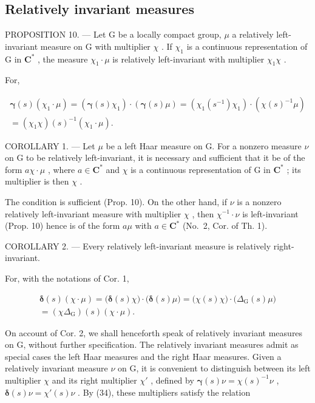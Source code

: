 \subsection{Relatively invariant measures}

PROPOSITION 10. --- Let G be a locally compact group, \(\mu\) a relatively left-invariant measure on G with multiplier \(\chi\) . If \(\chi_{1}\) is a continuous representation of G in \(\mathbf{C}^{*}\) , the measure \(\chi_{1} \cdot \mu\) is relatively left-invariant with multiplier \(\chi_{1}\chi\) .

For,

\[
\begin{array}{r} \pmb {\gamma} (s) (\chi_ {1} \cdot \mu) = (\pmb {\gamma} (s) \chi_ {1}) \cdot (\pmb {\gamma} (s) \mu) = (\chi_ {1} (s ^ {- 1}) \chi_ {1}) \cdot (\chi (s) ^ {- 1} \mu) \\ = (\chi_ {1} \chi) (s) ^ {- 1} (\chi_ {1} \cdot \mu). \end{array}
\]

COROLLARY 1. --- Let \(\mu\) be a left Haar measure on G. For a nonzero measure \(\nu\) on G to be relatively left-invariant, it is necessary and sufficient that it be of the form \(a\chi \cdot \mu\) , where \(a \in \mathbf{C}^*\) and \(\chi\) is a continuous representation of G in \(\mathbf{C}^*\) ; its multiplier is then \(\chi\) .

The condition is sufficient (Prop. 10). On the other hand, if \(\nu\) is a nonzero relatively left-invariant measure with multiplier \(\chi\) , then \(\chi^{-1} \cdot \nu\) is left-invariant (Prop. 10) hence is of the form \(a\mu\) with \(a \in \mathbf{C}^*\) (No.~2, Cor. of Th. 1).

COROLLARY 2. --- Every relatively left-invariant measure is relatively right-invariant.

For, with the notations of Cor. 1,

\[
\begin{array}{c} \boldsymbol {\delta} (s) (\chi \cdot \mu) = \bigl (\boldsymbol {\delta} (s) \chi \bigr) \cdot \bigl (\boldsymbol {\delta} (s) \mu \bigr) = \bigl (\chi (s) \chi \bigr) \cdot \bigl (\Delta_ {\mathrm{G}} (s) \mu \bigr) \\ = (\chi \Delta_ {\mathrm{G}}) (s) (\chi \cdot \mu). \end{array}\tag{34}
\]

On account of Cor. 2, we shall henceforth speak of relatively invariant measures on G, without further specification. The relatively invariant measures admit as special cases the left Haar measures and the right Haar measures. Given a relatively invariant measure \(\nu\) on G, it is convenient to distinguish between its left multiplier \(\chi\) and its right multiplier \(\chi'\) , defined by \(\pmb{\gamma}(s)\nu = \chi(s)^{-1}\nu\) , \(\pmb{\delta}(s)\nu = \chi'(s)\nu\) . By (34), these multipliers satisfy the relation

